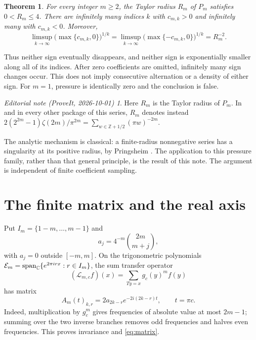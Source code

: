 \documentclass[11pt,a4paper]{article}
\newtheorem{theorem}{Theorem}[section]\newtheorem{lemma}[theorem]{Lemma}
\theoremstyle{remark}\newtheorem*{ednote}{Editorial note (ProveIt, 2026-10-01)}
\newcommand{\Lop}{\mathcal L}
\begin{document}
\begin{theorem}\label{thm:sign}
For every integer $m\ge2$, the Taylor radius $R_m$ of $P_m$ satisfies
$0<R_m\le4$. There are infinitely many indices $k$ with $c_{m,k}>0$ and infinitely many with $c_{m,k}<0$. Moreover,
\begin{equation}\label{eq:scale}
 \limsup_{k\to\infty}\bigl(\max\{c_{m,k},0\}\bigr)^{1/k}
 =
 \limsup_{k\to\infty}\bigl(\max\{-c_{m,k},0\}\bigr)^{1/k}
 =R_m^{-2}.
\end{equation}
\end{theorem}
Thus neither sign eventually disappears, and neither sign is exponentially smaller along all of its indices.
After zero coefficients are omitted, infinitely many sign changes occur.
This does not imply consecutive alternation or a density of either sign.
For $m=1$, pressure is identically zero and the conclusion is false.
\begin{ednote}
Here $R_m$ is the Taylor radius of $P_m$. In  and in every other package of
this series, $R_m$ denotes instead
$2(2^{2m}-1)\zeta(2m)/\pi^{2m}=\sum_{w\in\mathbb Z+1/2}(\pi w)^{-2m}$.
\end{ednote}

The analytic mechanism is classical: a finite-radius nonnegative series has a singularity at its positive radius, by Pringsheim \cite{FS}. The application to this pressure family, rather than that general principle, is the result of this note.
The argument is independent of finite coefficient sampling.

\section{The finite matrix and the real axis}\label{sec:real}
Put $I_m=\{1-m,\ldots,m-1\}$ and
\[
 a_j=4^{-m}\binom{2m}{m+j},
\]
with $a_j=0$ outside $[-m,m]$. On the trigonometric polynomials
$\mathcal E_m=\operatorname{span}_{\mathbb C}\{e^{2\pi i r x}:r\in I_m\}$, the sum transfer operator
\[
 (\Lop_{m,c}f)(x)=\sum_{Ty=x}g_c(y)^m f(y)
\]
has matrix
\begin{equation}\label{eq:matrix}
 A_m(t)_{k,r}=2a_{2k-r}e^{-2i(2k-r)t},\qquad t=\pi c.
\end{equation}
Indeed, multiplication by $g_c^m$ gives frequencies of absolute value at most $2m-1$; summing over the two inverse branches removes odd frequencies and halves even frequencies. This proves invariance and \eqref{eq:matrix}.
\end{document}
